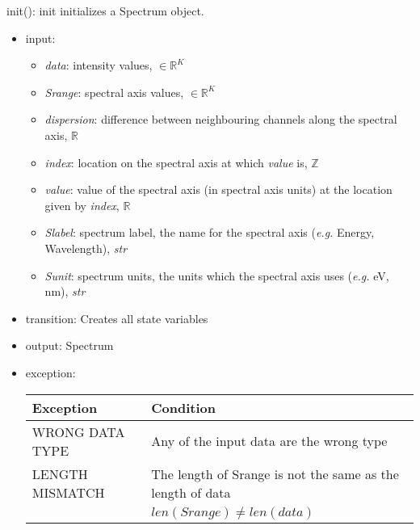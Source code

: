 \documentclass[12pt, titlepage]{article}
\begin{document}
\noindent init():
init initializes a Spectrum object.
\begin{itemize}
    \item input:
    \begin{itemize}
        \item \textit{data}: intensity values, $\in \mathbb{R}^K$
        \item \textit{Srange}: spectral axis values, $\in \mathbb{R}^K$
        \item \textit{dispersion}: difference  between neighbouring channels
        along the spectral axis,  $\mathbb{R}$
        \item \textit{index}: location on the spectral axis at which
        \textit{value} is, $\mathbb{Z}$
        \item \textit{value}: value of the spectral axis (in spectral axis
        units) at the location given by \textit{index}, $\mathbb{R}$
        \item \textit{Slabel}: spectrum label, the name for the spectral axis
        (\textit{e.g.} Energy, Wavelength), \textit{str}
        \item \textit{Sunit}: spectrum units, the units which the spectral axis
        uses (\textit{e.g.} \si{\electronvolt}, \si{\nano\metre}), \textit{str}
    \end{itemize}
    \item transition: Creates all state variables
    \item output: Spectrum 
    \item exception:
    \begin{center}
        \begin{tabular}{p{3cm} p{12cm}}
            \toprule[0.15em]
            \textbf{Exception} & \textbf{Condition}\\
            \midrule[0.1em]
            WRONG DATA TYPE & Any of the input data are the wrong type\\ 
            \midrule[0.05em]
            LENGTH MISMATCH & The length of Srange is not the same as the length of
            data\\
            & $len(Srange) \neq len(data)$\\
            \bottomrule[0.15em]
        \end{tabular}
    \end{center}
\end{itemize}
\end{document}

